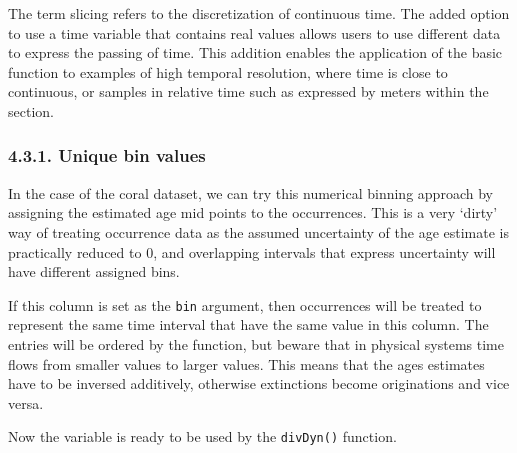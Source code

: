 \documentclass[]{article}
\newenvironment{Shaded}{\begin{snugshade}}{\end{snugshade}}
\newcommand{\DecValTok}[1]{\textcolor[rgb]{0.00,0.00,0.81}{#1}}
\newcommand{\KeywordTok}[1]{\textcolor[rgb]{0.13,0.29,0.53}{\textbf{#1}}}
\newcommand{\NormalTok}[1]{#1}
\newcommand{\OperatorTok}[1]{\textcolor[rgb]{0.81,0.36,0.00}{\textbf{#1}}}
\newcommand{\StringTok}[1]{\textcolor[rgb]{0.31,0.60,0.02}{#1}}
\begin{document}
The term slicing refers to the discretization of continuous time. The
added option to use a time variable that contains real values allows
users to use different data to express the passing of time. This
addition enables the application of the basic function to examples of
high temporal resolution, where time is close to continuous, or samples
in relative time such as expressed by meters within the section.

\hypertarget{unique-bin-values}{%
\subsubsection{4.3.1. Unique bin values}\label{unique-bin-values}}

In the case of the coral dataset, we can try this numerical binning
approach by assigning the estimated age mid points to the occurrences.
This is a very `dirty' way of treating occurrence data as the assumed
uncertainty of the age estimate is practically reduced to 0, and
overlapping intervals that express uncertainty will have different
assigned bins.

\begin{Shaded}
\end{Shaded}

If this column is set as the \texttt{bin} argument, then occurrences
will be treated to represent the same time interval that have the same
value in this column. The entries will be ordered by the function, but
beware that in physical systems time flows from smaller values to larger
values. This means that the ages estimates have to be inversed
additively, otherwise extinctions become originations and vice versa.

\begin{Shaded}
\end{Shaded}

Now the variable is ready to be used by the \texttt{divDyn()} function.
\end{document}
